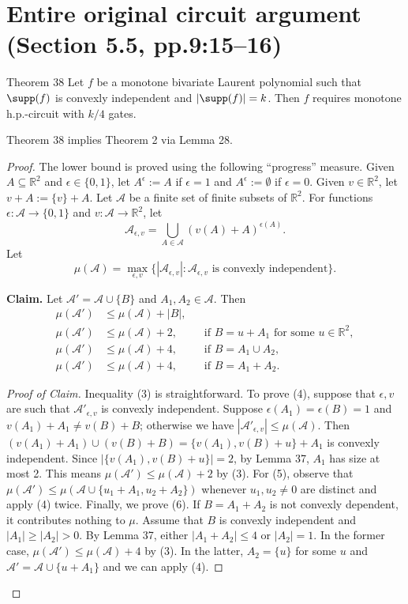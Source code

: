 \section*{Entire original circuit argument (Section 5.5, pp.9:15--16)}
\begin{sourceresult}{Theorem 38}
Let $f$ be a monotone bivariate Laurent polynomial such that $\supp(f)$ is convexly independent and $|\supp(f)|=k$. Then $f$ requires monotone h.p.-circuit with $k/4$ gates.
\end{sourceresult}
Theorem 38 implies Theorem 2 via Lemma 28.
\begin{proof}
The lower bound is proved using the following ``progress'' measure. Given $A\subseteq\mathbb R^2$ and $\epsilon\in\{0,1\}$, let $A^\epsilon:=A$ if $\epsilon=1$ and $A^\epsilon:=\emptyset$ if $\epsilon=0$. Given $v\in\mathbb R^2$, let $v+A:=\{v\}+A$. Let $\mathcal A$ be a finite set of finite subsets of $\mathbb R^2$. For functions $\epsilon:\mathcal A\to\{0,1\}$ and $v:\mathcal A\to\mathbb R^2$, let
\[\mathcal A_{\epsilon,v}=\bigcup_{A\in\mathcal A}(v(A)+A)^{\epsilon(A)}.\]
Let
\[\mu(\mathcal A)=\max_{\epsilon,v}\{|\mathcal A_{\epsilon,v}|:\mathcal A_{\epsilon,v}\text{ is convexly independent}\}.\]
\par\medskip\noindent\textbf{Claim.} Let $\mathcal A'=\mathcal A\cup\{B\}$ and $A_1,A_2\in\mathcal A$. Then
\begin{align}
\mu(\mathcal A')&\le\mu(\mathcal A)+|B|,\tag{3}\\
\mu(\mathcal A')&\le\mu(\mathcal A)+2,&&\text{if }B=u+A_1\text{ for some }u\in\mathbb R^2,\tag{4}\\
\mu(\mathcal A')&\le\mu(\mathcal A)+4,&&\text{if }B=A_1\cup A_2,\tag{5}\\
\mu(\mathcal A')&\le\mu(\mathcal A)+4,&&\text{if }B=A_1+A_2.\tag{6}
\end{align}
\begin{proof}[Proof of Claim]
Inequality (3) is straightforward.
To prove (4), suppose that $\epsilon,v$ are such that $\mathcal A'_{\epsilon,v}$ is convexly independent. Suppose $\epsilon(A_1)=\epsilon(B)=1$ and $v(A_1)+A_1\ne v(B)+B$; otherwise we have $|\mathcal A'_{\epsilon,v}|\le\mu(\mathcal A)$. Then $(v(A_1)+A_1)\cup(v(B)+B)=\{v(A_1),v(B)+u\}+A_1$ is convexly independent. Since $|\{v(A_1),v(B)+u\}|=2$, by Lemma 37, $A_1$ has size at most 2. This means $\mu(\mathcal A')\le\mu(\mathcal A)+2$ by (3).
For (5), observe that $\mu(\mathcal A')\le\mu(\mathcal A\cup\{u_1+A_1,u_2+A_2\})$ whenever $u_1,u_2\ne0$ are distinct and apply (4) twice.
Finally, we prove (6). If $B=A_1+A_2$ is not convexly dependent, it contributes nothing to $\mu$. Assume that $B$ is convexly independent and $|A_1|\ge|A_2|>0$. By Lemma 37, either $|A_1+A_2|\le4$ or $|A_2|=1$. In the former case, $\mu(\mathcal A')\le\mu(\mathcal A)+4$ by (3). In the latter, $A_2=\{u\}$ for some $u$ and $\mathcal A'=\mathcal A\cup\{u+A_1\}$ and we can apply (4).

\end{proof}
\end{proof}
